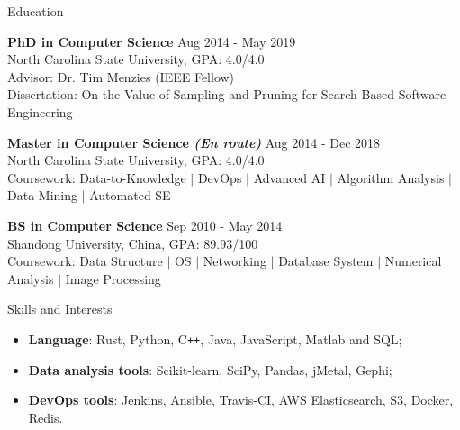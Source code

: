 \documentclass{resume} %
\newenvironment{myitemize}
{ \begin{itemize}[leftmargin=0.2em,label={}]
    \setlength{\itemsep}{0pt}
    \setlength{\parskip}{0pt}
    \setlength{\parsep}{0pt}     }
{ \end{itemize}                  }
\begin{document}
\begin{rSection}{Education}

{\bf PhD in Computer Science} \hfill {Aug 2014 - May 2019}\\ 
North Carolina State University, GPA: 4.0/4.0  \\
Advisor: Dr. Tim Menzies (IEEE Fellow) \\
Dissertation: On the Value of Sampling and Pruning for Search-Based Software Engineering

{\bf Master in Computer Science {\it (En route)}} \hfill {Aug 2014 - Dec 2018}\\ 
North Carolina State University, GPA: 4.0/4.0  \\
Coursework: Data-to-Knowledge $|$ DevOps $|$ Advanced AI $|$ Algorithm Analysis $|$ Data Mining $|$ Automated SE

{\bf BS in Computer Science} \hfill {Sep 2010 - May 2014}\\ 
Shandong University, China, GPA: 89.93/100  \\
Coursework: Data Structure $|$ OS $|$ Networking $|$ Database System $|$ Numerical Analysis $|$ Image Processing

\end{rSection} 


\begin{rSection}{Skills and Interests}
\begin{myitemize}\setlength\itemsep{0.1em}
    \item \textbf{Language}: Rust, Python, C\texttt{++}, Java, JavaScript, Matlab and SQL;
    \item \textbf{Data analysis tools}: Scikit-learn, SciPy, Pandas, jMetal, Gephi;
    \item \textbf{DevOps tools}: Jenkins, Ansible, Travis-CI, AWS Elasticsearch, S3, Docker, Redis.
\end{myitemize}


\end{rSection}
\end{document}
